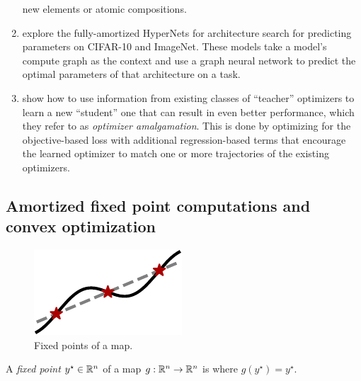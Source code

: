 \documentclass[twoside,11pt]{article}
\begin{document}
\begin{enumerate}
  new elements or atomic compositions.
\item \citet{zhang2018graph,knyazev2021parameter} explore
  the fully-amortized HyperNets for architecture search
  for predicting parameters on CIFAR-10 and ImageNet.
  These models take a model's compute graph as the
  context and use a graph neural network to predict
  the optimal parameters of that architecture on a task.
\item \citet{huang2022optimizer} show how to use
  information from existing classes of ``teacher''
  optimizers to learn a new ``student'' one that
  can result in even better performance,
  which they refer to as \emph{optimizer amalgamation}.
  This is done by optimizing for the objective-based
  loss with additional regression-based terms that
  encourage the learned optimizer to match one or
  more trajectories of the existing optimizers.
\end{enumerate}

\subsection{Amortized fixed point computations and convex optimization}
\label{sec:apps:convex}

\begin{figure}
\includegraphics[width=\linewidth]{fig/fp.pdf}
\caption{Fixed points of a map.}
\label{fig:fp}
\end{figure}


\begin{definition}
  A \emph{fixed point} $y^\star\in\mathbb{R}^n$ of a map
  $g:\mathbb{R}^n\rightarrow\mathbb{R}^n$ is where $g(y^\star) = y^\star$.
  \label{def:fixed}
\end{definition}
\end{document}
